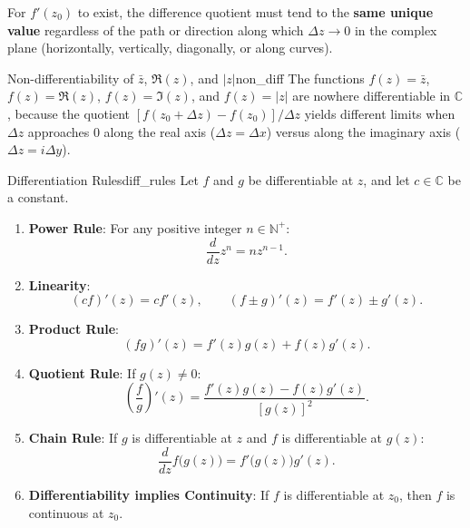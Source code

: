 \begin{remark}
For $f'(z_0)$ to exist, the difference quotient must tend to the \textbf{same unique value} regardless of the path or direction along which $\Delta z \to 0$ in the complex plane (horizontally, vertically, diagonally, or along curves).
\end{remark}

\begin{proposition}{Non-differentiability of $\bar{z}$, $\Re(z)$, and $|z|$}{non_diff}
The functions $f(z) = \bar{z}$, $f(z) = \Re(z)$, $f(z) = \Im(z)$, and $f(z) = |z|$ are nowhere differentiable in $\mathbb{C}$, because the quotient $[f(z_0 + \Delta z) - f(z_0)]/\Delta z$ yields different limits when $\Delta z$ approaches $0$ along the real axis ($\Delta z = \Delta x$) versus along the imaginary axis ($\Delta z = i\Delta y$).
\end{proposition}

\begin{proposition}{Differentiation Rules}{diff_rules}
Let $f$ and $g$ be differentiable at $z$, and let $c \in \mathbb{C}$ be a constant.
\begin{enumerate}
    \item \textbf{Power Rule}: For any positive integer $n \in \mathbb{N}^+$:
    \begin{equation}
    \frac{d}{dz} z^n = n z^{n-1}.
    \end{equation}
    \item \textbf{Linearity}:
    \begin{equation}
    (cf)'(z) = c f'(z), \qquad (f \pm g)'(z) = f'(z) \pm g'(z).
    \end{equation}
    \item \textbf{Product Rule}:
    \begin{equation}
    (fg)'(z) = f'(z) g(z) + f(z) g'(z).
    \end{equation}
    \item \textbf{Quotient Rule}: If $g(z) \neq 0$:
    \begin{equation}
    \left(\frac{f}{g}\right)'(z) = \frac{f'(z)g(z) - f(z)g'(z)}{[g(z)]^2}.
    \end{equation}
    \item \textbf{Chain Rule}: If $g$ is differentiable at $z$ and $f$ is differentiable at $g(z)$:
    \begin{equation}
    \frac{d}{dz} f\big(g(z)\big) = f'\big(g(z)\big) g'(z).
    \end{equation}
    \item \textbf{Differentiability implies Continuity}: If $f$ is differentiable at $z_0$, then $f$ is continuous at $z_0$.
\end{enumerate}
\end{proposition}

